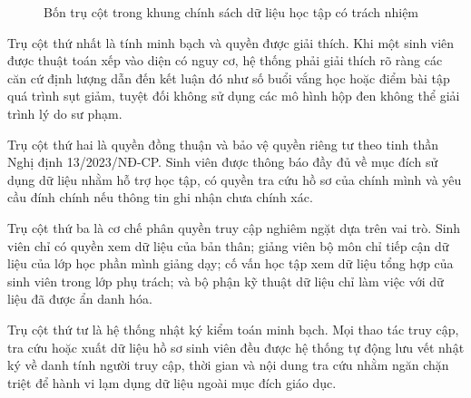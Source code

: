 \begin{figure}[htbp]
\centering
{}
\caption{Bốn trụ cột trong khung chính sách dữ liệu học tập có trách nhiệm}
\label{fig:four_pillars}
\end{figure}

Trụ cột thứ nhất là tính minh bạch và quyền được giải thích. Khi một sinh viên được thuật toán xếp vào diện có nguy cơ, hệ thống phải giải thích rõ ràng các căn cứ định lượng dẫn đến kết luận đó như số buổi vắng học hoặc điểm bài tập quá trình sụt giảm, tuyệt đối không sử dụng các mô hình hộp đen không thể giải trình lý do sư phạm.

Trụ cột thứ hai là quyền đồng thuận và bảo vệ quyền riêng tư theo tinh thần Nghị định 13/2023/NĐ-CP. Sinh viên được thông báo đầy đủ về mục đích sử dụng dữ liệu nhằm hỗ trợ học tập, có quyền tra cứu hồ sơ của chính mình và yêu cầu đính chính nếu thông tin ghi nhận chưa chính xác.

Trụ cột thứ ba là cơ chế phân quyền truy cập nghiêm ngặt dựa trên vai trò. Sinh viên chỉ có quyền xem dữ liệu của bản thân; giảng viên bộ môn chỉ tiếp cận dữ liệu của lớp học phần mình giảng dạy; cố vấn học tập xem dữ liệu tổng hợp của sinh viên trong lớp phụ trách; và bộ phận kỹ thuật dữ liệu chỉ làm việc với dữ liệu đã được ẩn danh hóa.

Trụ cột thứ tư là hệ thống nhật ký kiểm toán minh bạch. Mọi thao tác truy cập, tra cứu hoặc xuất dữ liệu hồ sơ sinh viên đều được hệ thống tự động lưu vết nhật ký về danh tính người truy cập, thời gian và nội dung tra cứu nhằm ngăn chặn triệt để hành vi lạm dụng dữ liệu ngoài mục đích giáo dục.
